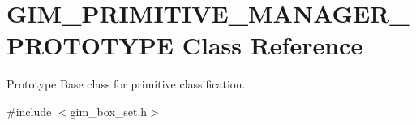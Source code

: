 \hypertarget{classGIM__PRIMITIVE__MANAGER__PROTOTYPE}{}\section{G\+I\+M\+\_\+\+P\+R\+I\+M\+I\+T\+I\+V\+E\+\_\+\+M\+A\+N\+A\+G\+E\+R\+\_\+\+P\+R\+O\+T\+O\+T\+Y\+PE Class Reference}
\label{classGIM__PRIMITIVE__MANAGER__PROTOTYPE}


Prototype Base class for primitive classification.  




{\ttfamily \#include $<$gim\+\_\+box\+\_\+set.\+h$>$}

